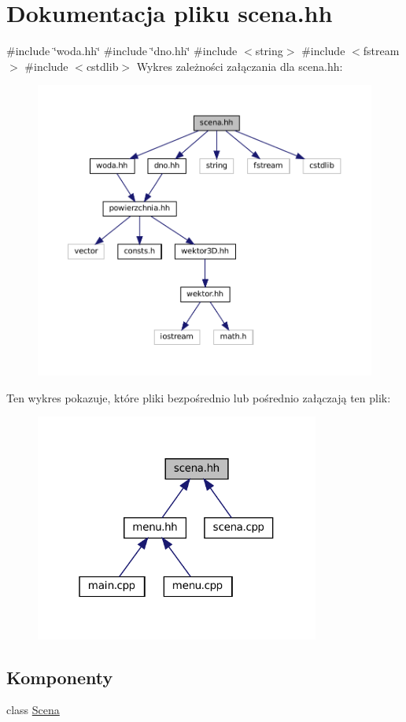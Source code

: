 \hypertarget{scena_8hh}{}\section{Dokumentacja pliku scena.\+hh}
\label{scena_8hh}
{\ttfamily \#include \char`\"{}woda.\+hh\char`\"{}}\newline
{\ttfamily \#include \char`\"{}dno.\+hh\char`\"{}}\newline
{\ttfamily \#include $<$string$>$}\newline
{\ttfamily \#include $<$fstream$>$}\newline
{\ttfamily \#include $<$cstdlib$>$}\newline
Wykres zależności załączania dla scena.\+hh\+:\nopagebreak
\begin{figure}[H]
\begin{center}
\leavevmode
\includegraphics[width=350pt]{scena_8hh__incl}
\end{center}
\end{figure}
Ten wykres pokazuje, które pliki bezpośrednio lub pośrednio załączają ten plik\+:\nopagebreak
\begin{figure}[H]
\begin{center}
\leavevmode
\includegraphics[width=265pt]{scena_8hh__dep__incl}
\end{center}
\end{figure}
\subsection*{Komponenty}
\begin{DoxyCompactItemize}
\item 
class \mbox{\hyperlink{class_scena}{Scena}}
\end{DoxyCompactItemize}
